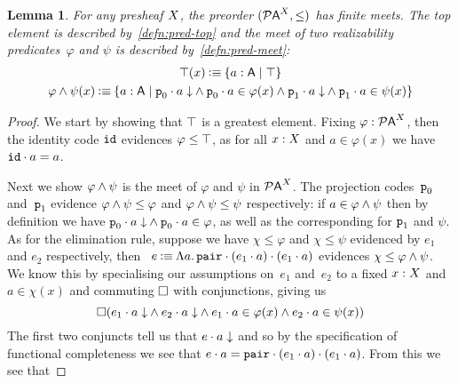 \documentclass[12pt]{article}
\newtheorem{lemm}[thrm]{Lemma}
\begin{document}

\begin{lemm}
  For any presheaf \(X\), the preorder \(({\mathcal{P}{\mathsf{A}}}^{X}, \leq)\) has finite
  meets.
  The top element is described by~\ref{defn:pred-top} and the meet of two
  realizability predicates~\(\varphi\) and \(\psi\) is described
  by~\ref{defn:pred-meet}:
  \begin{gather}
    \TTop{\X}(x)
    \IsDefined
    \ISetComp{a:\A}{\ITop}
    \label{defn:pred-top}
    \\
    \TAnd{\varphi}{\psi}{\X}(x)
    \IsDefined
    \ISetComp{a:\A}{\IAnd%
      {\IAnd{\ITotal{\IAp{\IFstCode}{a}}}{\IAp{\IFstCode}{a}\in\varphi(x)}}%
      {\IAnd{\ITotal{\IAp{\ISndCode}{a}}}{\IAp{\ISndCode}{a}\in\psi(x)}}
    }
    \label{defn:pred-meet}
  \end{gather}
\end{lemm}
\begin{proof}
  We start by showing that \(\top\) is a greatest element.
  Fixing \(\varphi:{\mathcal{P}{\mathsf{A}}}^{X}\), then the identity code \(\texttt{id}\)
  evidences \(\varphi \leq \top\), as for all \(x : X\) and
  \(a \in \varphi(x)\) we have \({\texttt{id}}\cdot{a} = a\).

  Next we show \({\varphi}\land{\psi}\) is the meet of \(\varphi\) and
  \(\psi\) in \({\mathcal{P}{\mathsf{A}}}^{X}\).
  The projection codes~\(\texttt{p}_0\) and~\(\texttt{p}_1\) evidence
  \({\varphi}\land{\psi}\leq\varphi\) and
  \({\varphi}\land{\psi}\leq\psi\) respectively:
  if \(a \in {\varphi}\land{\psi}\) then by definition we have
  \({{{\texttt{p}_0}\cdot{a}}\downarrow}\land{{\texttt{p}_0}\cdot{a}\in\varphi}\), as
  well as the corresponding for \(\texttt{p}_1\) and \(\psi\).
  As for the elimination rule, suppose we have \(\chi\leq\varphi\) and
  \(\chi\leq\psi\) evidenced by \(e_{1}\) and \(e_{2}\) respectively,
  then~%
  \(
    e \mathbin{\vcentcolon\equiv}
    \Lambda{a}.\,{{{\texttt{pair}}\cdot{({e_{1}}\cdot{a})}}\cdot{({e_{1}}\cdot{a})}}
  \)
  evidences \(\chi\leq{\varphi}\land{\psi}\).
  We know this by specialising our assumptions on~\(e_{1}\) and~\(e_{2}\)
  to a fixed \(x:X\) and \(a\in\chi(x)\) and commuting \(\Box\) with
  conjunctions, giving us
  \[
    \Box{
      ({
        {{{e_{1}}\cdot{a}}\downarrow}\land{{{e_{2}}\cdot{a}}\downarrow}
      }\land{
        {{e_{1}}\cdot{a}\in\varphi(x)}\land{{e_{2}}\cdot{a}\in\psi(x)}
      })
    }
  \]
  The first two conjuncts tell us that \({{e}\cdot{a}}\downarrow\) and so by the
  specification of functional completeness we see that
  \({e}\cdot{a} = {{\texttt{pair}}\cdot{({e_{1}}\cdot{a})}}\cdot{({e_{1}}\cdot{a})}\).
  From this we see that


\end{proof}
\end{document}
